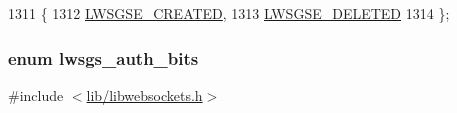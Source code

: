 \begin{DoxyCode}
1311                   \{
1312         \hyperlink{group__generic-sessions_ggaa93946b3d921072209d5cd8cdfa5332ea596010a165bf13473c5eea3a34cd4308}{LWSGSE\_CREATED}, 
1313         \hyperlink{group__generic-sessions_ggaa93946b3d921072209d5cd8cdfa5332ead908cdc5689c5d22c9d3c8934e94dcde}{LWSGSE\_DELETED}  
1314 \};
\end{DoxyCode}
\subsubsection[{\texorpdfstring{lwsgs\+\_\+auth\+\_\+bits}{lwsgs\_auth\_bits}}]{\setlength{\rightskip}{0pt plus 5cm}enum {\bf lwsgs\+\_\+auth\+\_\+bits}}\hypertarget{group__generic-sessions_ga7c2dc7bfb4ccb91c5d771f9e9ea237e1}{}\label{group__generic-sessions_ga7c2dc7bfb4ccb91c5d771f9e9ea237e1}


{\ttfamily \#include $<$\hyperlink{libwebsockets_8h}{lib/libwebsockets.\+h}$>$}

